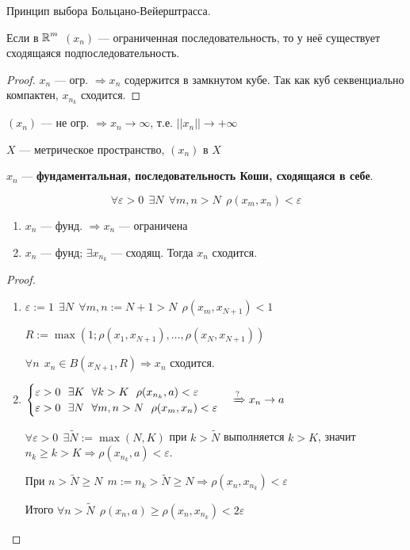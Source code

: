 \begin{consequence}
    Принцип выбора Больцано-Вейерштрасса.

    Если в $\operatorname*{\mathbb{R}}^m$ $(x_n)$ --- ограниченная последовательность, то у неё существует сходящаяся подпоследовательность.
\end{consequence}
\begin{proof}
    $x_n$ --- огр. $\Rightarrow x_n$ содержится в замкнутом кубе. Так как куб секвенциально компактен, $x_{n_k}$ сходится.
\end{proof}
\begin{remark}
    $(x_n)$ --- не огр. $\Rightarrow x_n\to\infty$, т.е. $||x_n||\to+\infty$
\end{remark}
\begin{definition}
    $X$ --- метрическое пространство, $(x_n)$ в $X$

    $x_n$ --- \textbf{фундаментальная, последовательность Коши, сходящаяся в себе}.
    
    $$\forall \varepsilon>0 \ \ \exists N \ \ \forall m,n > N\ \ \rho(x_m, x_n)<\varepsilon$$
\end{definition}
\begin{lemma}
    \begin{enumerate}
        \item $x_n$ --- фунд. $\Rightarrow x_n$ --- ограничена
        \item $x_n$ --- фунд; $\exists x_{n_k}$ --- сходящ. Тогда $x_n$ сходится. 
    \end{enumerate}
\end{lemma}
\begin{proof}
    \begin{enumerate}
        \item $\varepsilon:=1 \ \ \exists N \ \ \forall m, n:=N+1 > N \ \ \rho(x_m, x_{N+1})<1$
        
        $R:=\max(1; \rho(x_1, x_{N+1}),\ldots,\rho(x_N, x_{N+1}))$

        $\forall n \ \ x_n\in B(x_{N+1}, R) \Rightarrow x_n$ сходится.

        \item $\begin{cases}
            \varepsilon > 0 \ \ \exists K \ \ \forall k>K \ \ \rho(x_{n_k}, a)<\varepsilon \\
            \varepsilon > 0 \ \ \exists N \ \ \forall m,n>N \ \ \rho(x_m, x_n)<\varepsilon
        \end{cases} \xRightarrow{?} x_n\to a$

        $\forall \varepsilon > 0 \ \ \exists \tilde N := \max(N, K)$ при $k>\tilde N$ выполняется $k>K$, значит $n_k\geq k > K \Rightarrow \rho(x_{n_k}, a)<\varepsilon$.

        При $n>\tilde N\geq N \ \  m:=n_k>\tilde N\geq N \Rightarrow \rho(x_n, x_{n_k})<\varepsilon$

        Итого $\forall n>\tilde N \ \ \rho(x_n, a)\geq \rho(x_n, x_{n_k})<2\varepsilon$
    \end{enumerate}
\end{proof}
